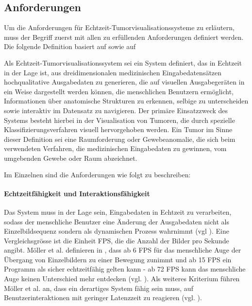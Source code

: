 \documentclass[a4paper,titlepage,12pt]{scrartcl}
\newtheorem[L]{boxedDefinition}{Definition}
\begin{document}
\subsection{Anforderungen}\label{ssec:requirements}
Um die Anforderungen für Echtzeit-Tumorvisualisationssysteme zu erläutern, muss der Begriff zuerst mit allen zu erfüllenden Anforderungen definiert werden. Die folgende Definition basiert auf \cite[Kapitel 3.1.1., Seite 17]{Bruckner2004} sowie auf \cite{Kutter2008}
\begin{boxedDefinition}\label{def:rttumorvissystem}
 Als Echtzeit-Tumorvisualisationssystem sei ein System definiert, das in Echtzeit in der Lage ist, aus dreidimensionalen medizinischen Eingabedatensätzen hochqualitative Ausgabedaten zu generieren, die auf visuellen Ausgabegeräten in ein Weise dargestellt werden können, die menschlichen Benutzern ermöglicht, Informationen über anatomische Strukturen zu erkennen, selbige zu unterscheiden sowie interaktiv im Datensatz zu navigieren. Der primäre Einsatzzweck des Systems besteht hierbei in der Visualisation von Tumoren, die durch spezielle Klassifizierungsverfahren visuell hervorgehoben werden.
 Ein Tumor im Sinne dieser Definition sei eine Raumforderung oder Gewebeanomalie, die sich beim verwendeten Verfahren, die medizinischen Eingabedaten zu gewinnen, vom umgebenden Gewebe oder Raum abzeichnet.
\end{boxedDefinition}

Im Einzelnen sind die Anforderungen wie folgt zu beschreiben:
\paragraph{Echtzeitfähigkeit und Interaktionsfähigkeit} \label{p:rtcapability} Das System muss in der Lage sein, Eingabedaten in Echtzeit zu verarbeiten, sodass der menschliche Benutzer eine Änderung der Ausgabedaten nicht als Einzelbildsequenz sondern als dynamischen Prozess wahrnimmt (vgl \cite[Kapitel 1, Seite 1]{Moeller2008}). Eine Vergleichsgrösse ist die Einheit FPS, die die Anzahl der Bilder pro Sekunde angibt. Möller et al. definieren in \cite{Moeller2008}, dass ab 6 FPS für das menschliche Auge der Übergang von Einzelbildern zu einer Bewegung zunimmt und ab 15 FPS ein Programm als sicher echtzeitfähig gelten kann - ab 72 FPS kann das menschliche Auge keinen Unterschied mehr entdecken (vgl. \cite[Kapitel 1, Seite 1]{Moeller2008}). Als weiteres Kriterium führen Möller et al. an, dass ein derartiges System fähig sein muss, auf Benutzerinteraktionen mit geringer Latenzzeit zu reagieren (vgl. \cite[Kapitel 1, Seite 1]{Moeller2008}).
\end{document}
